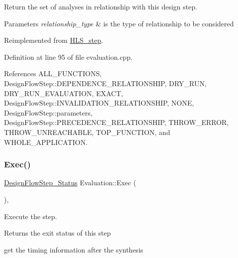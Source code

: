 Return the set of analyses in relationship with this design step. 


\begin{DoxyParams}{Parameters}
{\em relationship\+\_\+type} & is the type of relationship to be considered \\
\hline
\end{DoxyParams}


Reimplemented from \hyperlink{classHLS__step_aed0ce8cca9a1ef18e705fc1032ad4de5}{H\+L\+S\+\_\+step}.



Definition at line 95 of file evaluation.\+cpp.



References A\+L\+L\+\_\+\+F\+U\+N\+C\+T\+I\+O\+NS, Design\+Flow\+Step\+::\+D\+E\+P\+E\+N\+D\+E\+N\+C\+E\+\_\+\+R\+E\+L\+A\+T\+I\+O\+N\+S\+H\+IP, D\+R\+Y\+\_\+\+R\+UN, D\+R\+Y\+\_\+\+R\+U\+N\+\_\+\+E\+V\+A\+L\+U\+A\+T\+I\+ON, E\+X\+A\+CT, Design\+Flow\+Step\+::\+I\+N\+V\+A\+L\+I\+D\+A\+T\+I\+O\+N\+\_\+\+R\+E\+L\+A\+T\+I\+O\+N\+S\+H\+IP, N\+O\+NE, Design\+Flow\+Step\+::parameters, Design\+Flow\+Step\+::\+P\+R\+E\+C\+E\+D\+E\+N\+C\+E\+\_\+\+R\+E\+L\+A\+T\+I\+O\+N\+S\+H\+IP, T\+H\+R\+O\+W\+\_\+\+E\+R\+R\+OR, T\+H\+R\+O\+W\+\_\+\+U\+N\+R\+E\+A\+C\+H\+A\+B\+LE, T\+O\+P\+\_\+\+F\+U\+N\+C\+T\+I\+ON, and W\+H\+O\+L\+E\+\_\+\+A\+P\+P\+L\+I\+C\+A\+T\+I\+ON.

\mbox{\label{classEvaluation_a74f7914b49ce8c21b264857eb5c2d81d}} 
\subsubsection{\texorpdfstring{Exec()}{Exec()}}
{\footnotesize\ttfamily \hyperlink{design__flow__step_8hpp_afb1f0d73069c26076b8d31dbc8ebecdf}{Design\+Flow\+Step\+\_\+\+Status} Evaluation\+::\+Exec (\begin{DoxyParamCaption}{ }\end{DoxyParamCaption})\hspace{0.3cm}{\ttfamily [override]}, {\ttfamily [virtual]}}



Execute the step. 

\begin{DoxyReturn}{Returns}
the exit status of this step 
\end{DoxyReturn}
get the timing information after the synthesis

